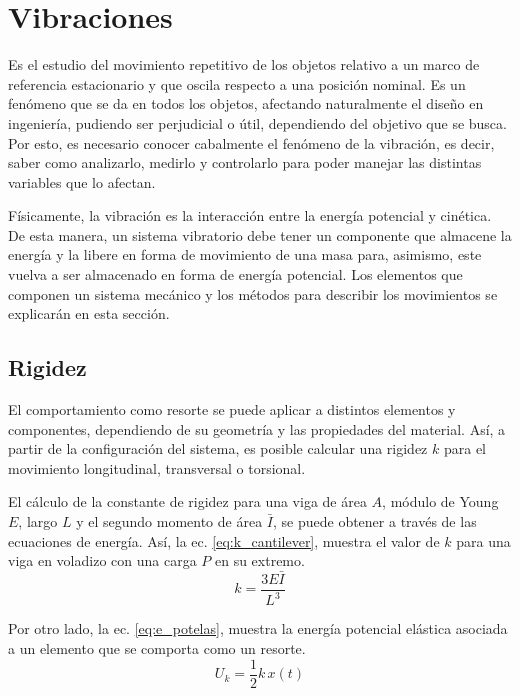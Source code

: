 \section{Vibraciones}
Es el estudio del movimiento repetitivo de los objetos relativo a un marco de referencia estacionario y que oscila respecto a una posición nominal. Es un fenómeno que se da en todos los objetos, afectando naturalmente el diseño en ingeniería, pudiendo ser perjudicial o útil, dependiendo del objetivo que se busca. Por esto, es necesario conocer cabalmente el fenómeno de la vibración, es decir, saber como analizarlo, medirlo y controlarlo para poder manejar las distintas variables que lo afectan.

Físicamente, la vibración es la interacción entre la energía potencial y cinética. De esta manera, un sistema vibratorio debe tener un componente que almacene la energía y la libere en forma de movimiento de una masa para, asimismo, este vuelva a ser almacenado en forma de energía potencial. Los elementos que componen un sistema mecánico y los métodos para describir los movimientos se explicarán en esta sección.


\subsection{Rigidez}
El comportamiento como resorte se puede aplicar a distintos elementos y componentes, dependiendo de su geometría y las propiedades del material. Así, a partir de la configuración del sistema, es posible calcular una rigidez $k$ para el movimiento longitudinal, transversal o torsional. 

El cálculo de la constante de rigidez para una viga de área $A$, módulo de Young $E$, largo $L$ y el segundo momento de área $\bar{I}$, se puede obtener a través de las ecuaciones de energía. Así, la ec. \ref{eq:k_cantilever}, muestra el valor de $k$ para una viga en voladizo con una carga $P$ en su extremo.
\begin{equation}\label{eq:k_cantilever}
	k = \frac{3E\bar{I}}{L^3}
\end{equation}

Por otro lado, la ec. \ref{eq:e_potelas}, muestra la energía potencial elástica asociada a un elemento que se comporta como un resorte.
\begin{equation}\label{eq:e_potelas}
	U_k = \frac{1}{2}k\,x(t)
\end{equation}


